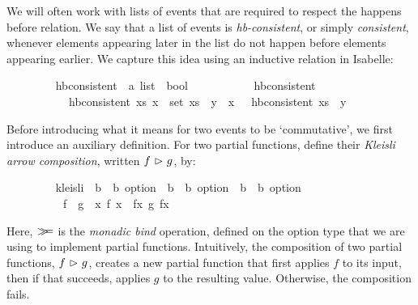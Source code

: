 We will often work with lists of events that are required to respect the happens before relation.
We say that a list of events  is \emph{hb-consistent}, or simply \emph{consistent}, whenever elements appearing later in the list do not happen before elements appearing earlier.
We capture this idea using an inductive relation in Isabelle:
\vspace{0.375em}
\begin{isabellebody}
\ \ \ \ \ \ \ \  hb{\isacharunderscore}consistent\ {\isacharcolon}{\isacharcolon}\ {\isachardoublequoteopen}{\isacharprime}a\ list\ {\isasymRightarrow}\ bool{\isachardoublequoteclose}\ \isanewline
\ \ \ \ \ \ \ \ \ \ {\isachardoublequoteopen}hb{\isacharunderscore}consistent\ {\isacharbrackleft}{\isacharbrackright}{\isachardoublequoteclose}\ {\isacharbar}\isanewline
\ \ \ \ \ \ \ \ \ \ {\isachardoublequoteopen}{\isasymlbrakk}\ hb{\isacharunderscore}consistent\ xs{\isacharsemicolon}\ {\isasymforall}x\ {\isasymin}\ set\ xs{\isachardot}\ {\isasymnot}\ y\ {\isasymprec}\ x\ {\isasymrbrakk}\ {\isasymLongrightarrow}\ hb{\isacharunderscore}consistent\ {\isacharparenleft}xs\ {\isacharat}\ {\isacharbrackleft}y{\isacharbrackright}{\isacharparenright}{\isachardoublequoteclose}
\end{isabellebody}
\vspace{0.375em}
Before introducing what it means for two events to be `commutative', we first introduce an auxiliary definition.
For two partial functions, define their \emph{Kleisli arrow composition}, written $f\ {\isasymrhd}\ g$, by:
\vspace{0.375em}
\begin{isabellebody}
\ \ \ \ \ \ \ \  kleisli\ {\isacharcolon}{\isacharcolon}\ {\isachardoublequoteopen}{\isacharparenleft}{\isacharprime}b\ {\isasymRightarrow}\ {\isacharprime}b\ option{\isacharparenright}\ {\isasymRightarrow}\ {\isacharparenleft}{\isacharprime}b\ {\isasymRightarrow}\ {\isacharprime}b\ option{\isacharparenright}\ {\isasymRightarrow}\ {\isacharparenleft}{\isacharprime}b\ {\isasymRightarrow}\ {\isacharprime}b\ option{\isacharparenright}{\isachardoublequoteclose}\ {\isacharparenleft}\ {\isachardoublequoteopen}{\isasymrhd}{\isachardoublequoteclose}\ {}{}{\isacharparenright}\ \isanewline
\ \ \ \ \ \ \ \ \ \ {\isachardoublequoteopen}f\ {\isasymrhd}\ g\ {\isasymequiv}\ {\isasymlambda}x{\isachardot}\ f\ x\ {\isasymbind}\ {\isacharparenleft}{\isasymlambda}fx{\isachardot}\ g\ fx{\isacharparenright}{\isachardoublequoteclose}
\end{isabellebody}
\vspace{0.375em}
Here, $\emph{$\mathbin{>\!\!\!>\mkern-6.7mu=}$}$ is the \emph{monadic bind} operation, defined on the option type that we are using to implement partial functions.
Intuitively, the composition of two partial functions, $f\ {\isasymrhd}\ g$, creates a new partial function that first applies $f$ to its input, then if that succeeds, applies $g$ to the resulting value.
Otherwise, the composition fails.

